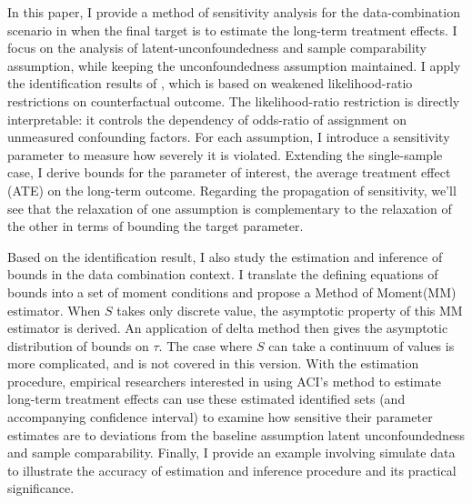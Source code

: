 \documentclass[12pt]{article}
\begin{document}
	
	In this paper, I provide a method of sensitivity analysis for the data-combination scenario in \textcite{athey2020combining} when the final target is to estimate the long-term treatment effects. I focus on the analysis of latent-unconfoundedness and sample comparability assumption, while keeping the unconfoundedness assumption maintained.
    I apply the identification results of \textcite{yadlowsky2018bounds}, which is based on weakened likelihood-ratio restrictions on counterfactual outcome. The likelihood-ratio restriction is directly interpretable: it controls the dependency of odds-ratio of assignment on unmeasured confounding factors. For each assumption, I introduce a sensitivity parameter to measure how severely it is violated. Extending the single-sample case, I derive bounds for the parameter of interest, the average treatment effect (ATE) on the long-term outcome. Regarding the propagation of sensitivity, we'll see that the relaxation of one assumption is complementary to the relaxation of the other in terms of bounding the target parameter.
	
	
	Based on the identification result, I also study the estimation and inference of bounds in the data combination context.
    I translate the defining equations of bounds into a set of moment conditions and propose a Method of Moment(MM) estimator. 
    When $S$ takes only discrete value, the asymptotic property of this MM estimator is derived. An application of delta method then gives the asymptotic distribution of bounds on $\tau$. The case where $S$ can take a continuum of values is more complicated, and is not covered in this version.
    With the estimation procedure, empirical researchers interested in using ACI's method to estimate long-term treatment effects can use these estimated identified sets (and accompanying confidence interval) to examine how sensitive their parameter estimates are to deviations from the baseline assumption latent unconfoundedness and sample comparability. 
    Finally, I provide an example involving simulate data to illustrate the accuracy of estimation and inference procedure and its practical significance. 
	
\end{document}
